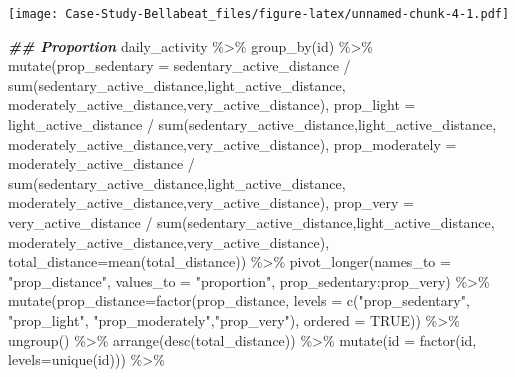 \documentclass[
]{article}
\newenvironment{Shaded}{\begin{snugshade}}{\end{snugshade}}
\newcommand{\AttributeTok}[1]{\textcolor[rgb]{0.77,0.63,0.00}{#1}}
\newcommand{\ConstantTok}[1]{\textcolor[rgb]{0.00,0.00,0.00}{#1}}
\newcommand{\DocumentationTok}[1]{\textcolor[rgb]{0.56,0.35,0.01}{\textbf{\textit{#1}}}}
\newcommand{\FunctionTok}[1]{\textcolor[rgb]{0.00,0.00,0.00}{#1}}
\newcommand{\NormalTok}[1]{#1}
\newcommand{\SpecialCharTok}[1]{\textcolor[rgb]{0.00,0.00,0.00}{#1}}
\newcommand{\StringTok}[1]{\textcolor[rgb]{0.31,0.60,0.02}{#1}}
\begin{document}
\texttt{[image: Case-Study-Bellabeat\_files/figure-latex/unnamed-chunk-4-1.pdf]}

\begin{Shaded}
\begin{Highlighting}[]
\DocumentationTok{\#\# Proportion}
\NormalTok{daily\_activity }\SpecialCharTok{\%\textgreater{}\%}
  \FunctionTok{group\_by}\NormalTok{(id) }\SpecialCharTok{\%\textgreater{}\%}
  \FunctionTok{mutate}\NormalTok{(}\AttributeTok{prop\_sedentary =}\NormalTok{ sedentary\_active\_distance }\SpecialCharTok{/} \FunctionTok{sum}\NormalTok{(sedentary\_active\_distance,light\_active\_distance,}
\NormalTok{                    moderately\_active\_distance,very\_active\_distance),}
         \AttributeTok{prop\_light =}\NormalTok{ light\_active\_distance }\SpecialCharTok{/} \FunctionTok{sum}\NormalTok{(sedentary\_active\_distance,light\_active\_distance,}
\NormalTok{                    moderately\_active\_distance,very\_active\_distance),}
         \AttributeTok{prop\_moderately =}\NormalTok{ moderately\_active\_distance }\SpecialCharTok{/} \FunctionTok{sum}\NormalTok{(sedentary\_active\_distance,light\_active\_distance,}
\NormalTok{                    moderately\_active\_distance,very\_active\_distance),}
         \AttributeTok{prop\_very =}\NormalTok{ very\_active\_distance }\SpecialCharTok{/} \FunctionTok{sum}\NormalTok{(sedentary\_active\_distance,light\_active\_distance,}
\NormalTok{                    moderately\_active\_distance,very\_active\_distance),}
            \AttributeTok{total\_distance=}\FunctionTok{mean}\NormalTok{(total\_distance)) }\SpecialCharTok{\%\textgreater{}\%}
  \FunctionTok{pivot\_longer}\NormalTok{(}\AttributeTok{names\_to =} \StringTok{"prop\_distance"}\NormalTok{, }\AttributeTok{values\_to =} \StringTok{"proportion"}\NormalTok{, prop\_sedentary}\SpecialCharTok{:}\NormalTok{prop\_very) }\SpecialCharTok{\%\textgreater{}\%}
  \FunctionTok{mutate}\NormalTok{(}\AttributeTok{prop\_distance=}\FunctionTok{factor}\NormalTok{(prop\_distance, }
                              \AttributeTok{levels =} \FunctionTok{c}\NormalTok{(}\StringTok{"prop\_sedentary"}\NormalTok{, }\StringTok{"prop\_light"}\NormalTok{, }\StringTok{"prop\_moderately"}\NormalTok{,}\StringTok{"prop\_very"}\NormalTok{),}
                              \AttributeTok{ordered =} \ConstantTok{TRUE}\NormalTok{)) }\SpecialCharTok{\%\textgreater{}\%}
  \FunctionTok{ungroup}\NormalTok{() }\SpecialCharTok{\%\textgreater{}\%}
  \FunctionTok{arrange}\NormalTok{(}\FunctionTok{desc}\NormalTok{(total\_distance)) }\SpecialCharTok{\%\textgreater{}\%}
  \FunctionTok{mutate}\NormalTok{(}\AttributeTok{id =} \FunctionTok{factor}\NormalTok{(id, }\AttributeTok{levels=}\FunctionTok{unique}\NormalTok{(id))) }\SpecialCharTok{\%\textgreater{}\%}

\end{Highlighting}
\end{Shaded}
\end{document}
